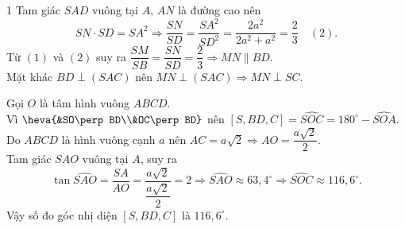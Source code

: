 \begin{bt}
{\begin{enumEX}{1}
		Tam giác $SAD$ vuông tại $A$, $AN$ là đường cao nên 
		$$SN\cdot SD=SA^2\Rightarrow \dfrac{SN}{SD}=\dfrac{SA^2}{SD^2}=\dfrac{2a^2}{2a^2+a^2}=\dfrac{2}{3}\quad (2).$$
		Từ $(1)$ và $(2)$ suy ra $\dfrac{SM}{SB}=\dfrac{SN}{SD}=\dfrac{2}{3}\Rightarrow MN\parallel BD$.\\
		Mặt khác $BD\perp (SAC)$ nên $MN\perp (SAC)\Rightarrow MN\perp SC$.
		\item Gọi $O$ là tâm hình vuông $ABCD$.\\
		Vì $\heva{&SO\perp BD\\&OC\perp BD}$ nên $[S,BD,C]=\widehat{SOC}=180^\circ-\widehat{SOA}$.\\
		Do $ABCD$ là hình vuông cạnh $a$ nên $AC=a\sqrt{2}\Rightarrow AO=\dfrac{a\sqrt{2}}{2}$.\\
		Tam giác $SAO$ vuông tại $A$, suy ra 
		$$ \tan\widehat{SAO}=\dfrac{SA}{AO}=\dfrac{a\sqrt{2}}{\dfrac{a\sqrt{2}}{2}}=2\Rightarrow \widehat{SAO}\approx 63{,}4^\circ\Rightarrow \widehat{SOC}\approx 116{,}6^\circ.$$
		Vậy số đo góc nhị diện $[S,BD,C]$ là $116{,}6^\circ$.
	\end{enumEX}
	}
\end{bt}

